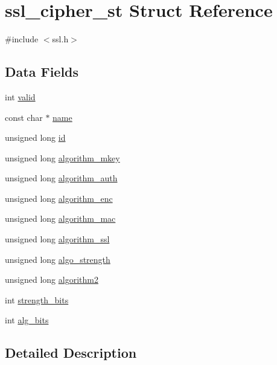 \hypertarget{structssl__cipher__st}{}\section{ssl\+\_\+cipher\+\_\+st Struct Reference}
\label{structssl__cipher__st}


{\ttfamily \#include $<$ssl.\+h$>$}

\subsection*{Data Fields}
\begin{DoxyCompactItemize}
\item 
int \hyperlink{structssl__cipher__st_ac63b1f168765a53e565a8ba27f5469d1}{valid}
\item 
const char $\ast$ \hyperlink{structssl__cipher__st_afcd1706c9144e6d6eee6127661ae3be2}{name}
\item 
unsigned long \hyperlink{structssl__cipher__st_af17b8bd946e0f93c6550050f9e8aa349}{id}
\item 
unsigned long \hyperlink{structssl__cipher__st_aab0332f63d2beb9ee30db884c4bb8f16}{algorithm\+\_\+mkey}
\item 
unsigned long \hyperlink{structssl__cipher__st_a0e8021fc00640eb8e718e6d8408fa679}{algorithm\+\_\+auth}
\item 
unsigned long \hyperlink{structssl__cipher__st_ae6787219085591bd4f3aee0ebea06afc}{algorithm\+\_\+enc}
\item 
unsigned long \hyperlink{structssl__cipher__st_a301abf706d5c57b092c312c2a0a5b2e0}{algorithm\+\_\+mac}
\item 
unsigned long \hyperlink{structssl__cipher__st_ac245ac6d6c85f50670aca69d3ad14acc}{algorithm\+\_\+ssl}
\item 
unsigned long \hyperlink{structssl__cipher__st_ac8b0d65d4922f2af4cbb506b0302429b}{algo\+\_\+strength}
\item 
unsigned long \hyperlink{structssl__cipher__st_aa1bc3c7504b2b9a1c0d2a8d051da6a4c}{algorithm2}
\item 
int \hyperlink{structssl__cipher__st_acfde445d8939bd98550e9b431a125828}{strength\+\_\+bits}
\item 
int \hyperlink{structssl__cipher__st_ad86d30d946b2626d2ea32dc374029ceb}{alg\+\_\+bits}
\end{DoxyCompactItemize}


\subsection{Detailed Description}


